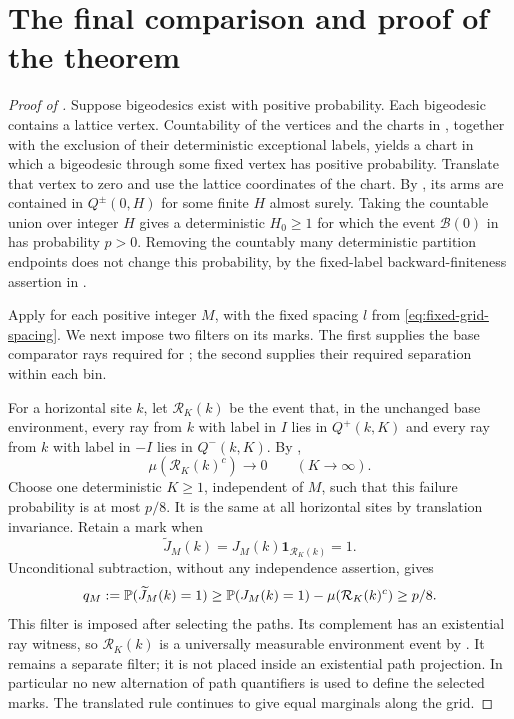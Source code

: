 \section{The final comparison and proof of the theorem}\label{sec:conclusion}

\begin{proof}[Proof of ]
Suppose bigeodesics exist with positive probability.  Each bigeodesic
contains a lattice vertex.  Countability of the vertices and the charts
in , together with the exclusion of their deterministic
exceptional labels, yields a chart in which a bigeodesic through some
fixed vertex has positive probability.  Translate that vertex to zero
and use the lattice coordinates of the chart.  By , its
arms are contained in $Q^\pm(0,H)$ for some finite $H$ almost surely.
Taking the countable union over integer $H$ gives a deterministic
$H_0\geq1$ for which the event $\mathcal B(0)$ in  has
probability $p>0$.  Removing the countably many deterministic partition
endpoints does not change this probability, by the fixed-label
backward-finiteness assertion in .

Apply  for each positive integer $M$, with the
fixed spacing $l$ from \eqref{eq:fixed-grid-spacing}.  We next impose
two filters on its marks.  The first supplies the base comparator rays
required for ; the second supplies their
required separation within each bin.

For a horizontal site $k$, let $\mathcal R_K(k)$ be the event that, in
the unchanged base environment, every ray from $k$ with label in $I$
lies in $Q^+(k,K)$ and every ray from $k$ with label in $-I$ lies in
$Q^-(k,K)$.  By ,
\[
 \mu(\mathcal R_K(k)^c)\longrightarrow0\qquad(K\longrightarrow\infty).
\]
Choose one deterministic $K\geq1$, independent of $M$, such that this
failure probability is at most $p/8$.  It is the same at all horizontal
sites by translation invariance.  Retain a mark when
\[
 \widetilde J_M(k)=J_M(k)\mathbf1_{\mathcal R_K(k)}=1.
\]
Unconditional subtraction, without any independence assertion, gives
\begin{equation}\label{eq:retained-mark-probability}
 q_M:=\mathbb P(\widetilde J_M(k)=1)
 \geq\mathbb P(J_M(k)=1)-\mu(\mathcal R_K(k)^c)
 \geq p/8.
\end{equation}
This filter is imposed after selecting the paths.  Its complement has
an existential ray witness, so $\mathcal R_K(k)$ is a universally
measurable environment event by .  It remains a
separate filter; it is not placed inside an existential path projection.
In particular no new alternation of path quantifiers is used to define
the selected marks.  The translated rule continues to give equal
marginals along the grid.


\end{proof}
